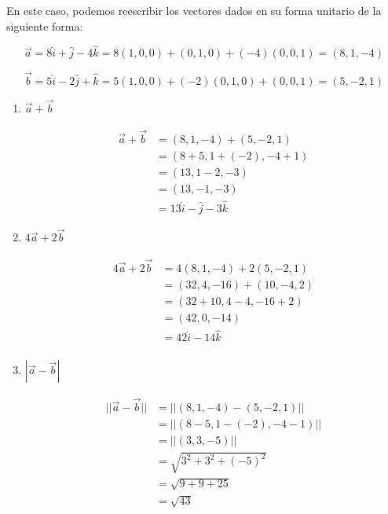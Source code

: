 \documentclass[12pt]{article}
\begin{document}
En este caso, podemos reescribir los vectores dados en su forma unitario de la siguiente forma:

\[
\vec{a} = 8\hat{i} + \hat{j} - 4\hat{k} = 8(1, 0, 0) + (0,1,0) + (-4) (0,0,1) = (8, 1, -4)
\]

\[
\vec{b} = 5\hat{i} - 2\hat{j} +\hat{k} = 5(1, 0, 0) + (-2) (0,1,0) + (0,0,1) = (5, -2, 1)
\]

\begin{enumerate}[format=\textbf]
  
\item $\vec{a} + \vec{b}$
  
  \begin{equation*}
    \begin{split}
      \vec{a} + \vec{b} &= (8, 1, -4) + (5, -2, 1)\\
      &= (8+5,1+ (-2), -4+1) \\
      &=(13, 1-2, -3)\\
      &= (13, -1, -3) \\
      &= 13\hat{i} - \hat{j} -3\hat{k}
    \end{split}
  \end{equation*}
  
\item $4 \vec{a} + 2\vec{b}$
  
  \begin{equation*}
    \begin{split}
      4 \vec{a} + 2\vec{b} &= 4(8, 1, -4) + 2(5, -2, 1)\\
      &=  (32, 4, -16) + (10, -4, 2)\\
      &=  (32+10, 4-4, -16+2) \\
      &= (42, 0, -14)\\
      &= 42\hat{i}  - 14\hat{k} \\
    \end{split}
  \end{equation*}

\item $|\vec{a} - \vec{b}|$
  
  \begin{equation*}
    \begin{split}
      ||\vec{a} - \vec{b}|| &= ||(8, 1, -4) - (5, -2, 1)|| \\
      &= ||(8-5, 1-(-2), -4-1) || \\
      &= ||(3, 3, -5)|| \\
      &= \sqrt{3^2 + 3^2 + (-5)^2} \\
      &= \sqrt{9 + 9 + 25} \\
      &= \sqrt{43} \\
    \end{split}
  \end{equation*}


\end{enumerate}
\end{document}
